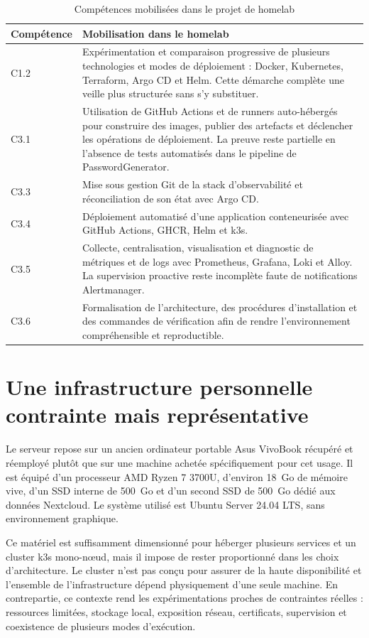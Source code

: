 \begin{table}[H]
\centering
\begin{tabular}{p{2.2cm} p{11.8cm}}
\toprule
\textbf{Compétence} & \textbf{Mobilisation dans le homelab} \\
\midrule
C1.2 & Expérimentation et comparaison progressive de plusieurs technologies et modes de déploiement : Docker, Kubernetes, Terraform, Argo CD et Helm. Cette démarche complète une veille plus structurée sans s'y substituer. \\
C3.1 & Utilisation de GitHub Actions et de runners auto-hébergés pour construire des images, publier des artefacts et déclencher les opérations de déploiement. La preuve reste partielle en l'absence de tests automatisés dans le pipeline de PasswordGenerator. \\
C3.3 & Mise sous gestion Git de la stack d'observabilité et réconciliation de son état avec Argo CD. \\
C3.4 & Déploiement automatisé d'une application conteneurisée avec GitHub Actions, GHCR, Helm et k3s. \\
C3.5 & Collecte, centralisation, visualisation et diagnostic de métriques et de logs avec Prometheus, Grafana, Loki et Alloy. La supervision proactive reste incomplète faute de notifications Alertmanager. \\
C3.6 & Formalisation de l'architecture, des procédures d'installation et des commandes de vérification afin de rendre l'environnement compréhensible et reproductible. \\
\bottomrule
\end{tabular}
\caption{Compétences mobilisées dans le projet de homelab}
\label{tab:competences-homelab}
\end{table}

\section{Une infrastructure personnelle contrainte mais représentative}

Le serveur repose sur un ancien ordinateur portable Asus VivoBook récupéré et réemployé plutôt que sur une machine achetée spécifiquement pour cet usage. Il est équipé d'un processeur AMD Ryzen 7 3700U, d'environ 18~Go de mémoire vive, d'un SSD interne de 500~Go et d'un second SSD de 500~Go dédié aux données Nextcloud. Le système utilisé est Ubuntu Server 24.04 LTS, sans environnement graphique.

Ce matériel est suffisamment dimensionné pour héberger plusieurs services et un cluster k3s mono-nœud, mais il impose de rester proportionné dans les choix d'architecture. Le cluster n'est pas conçu pour assurer de la haute disponibilité et l'ensemble de l'infrastructure dépend physiquement d'une seule machine. En contrepartie, ce contexte rend les expérimentations proches de contraintes réelles : ressources limitées, stockage local, exposition réseau, certificats, supervision et coexistence de plusieurs modes d'exécution.

